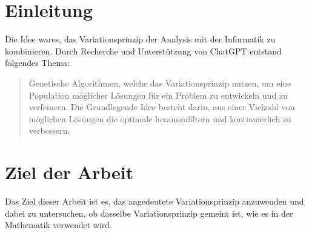 %
%
%
%
\section{Einleitung
\label{buch:paper:section:introduction}}
Die Idee wares, das Variationsprinzip der Analysis mit der Informatik zu kombinieren. 
Durch Recherche und Unterstützung von ChatGPT entstand folgendes Thema:

\begin{quote}
    Genetische Algorithmen, welche das Variationsprinzip nutzen, um eine Population 
    möglicher Lösungen für ein Problem zu entwickeln und zu verfeinern. 
    Die Grundlegende Idee besteht darin, aus einer Vielzahl von möglichen Lösungen 
    die optimale herauszufiltern und kontinuierlich zu verbessern.
\end{quote}

\section{Ziel der Arbeit
\label{buch:paper:varalg:section:goal}} 
Das Ziel dieser Arbeit ist es, das angedeutete Variationsprinzip anzuwenden und dabei 
zu untersuchen, ob dasselbe Variationsprinzip gemeint ist, wie es in der Mathematik 
verwendet wird.
